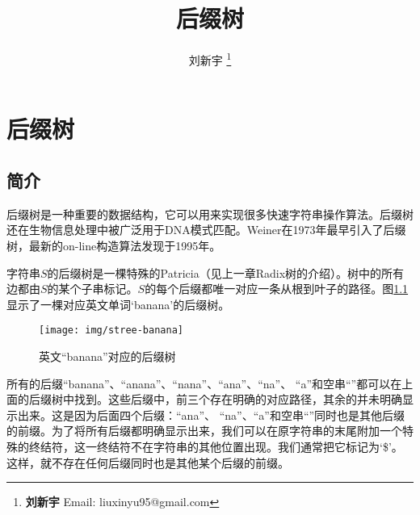 \documentclass{ctexart}
\begin{document}


\title{后缀树}

\author{刘新宇
\thanks{{\bfseries 刘新宇 } \newline
  Email: liuxinyu95@gmail.com \newline}
  }

\maketitle
\fi


\ifx\wholebook\relax
\chapter{后缀树}
\fi


\section{简介}
\label{introduction}

后缀树是一种重要的数据结构，它可以用来实现很多快速字符串操作算法\cite{wiki-suffix-tree}。后缀树还在生物信息处理中被广泛用于DNA模式匹配\cite{ukkonen-presentation}。Weiner在1973年最早引入了后缀树\cite{weiner73}，最新的on-line构造算法发现于1995年\cite{ukkonen95}。

字符串$S$的后缀树是一棵特殊的Patricia（见上一章Radix树的介绍）。树中的所有边都由$S$的某个子串标记。$S$的每个后缀都唯一对应一条从根到叶子的路径。图\ref{fig:stree-banana}显示了一棵对应英文单词‘banana’的后缀树。

\begin{figure}[htbp]
  \centering
  \texttt{[image: img/stree-banana]}
  \caption{英文“banana”对应的后缀树} \label{fig:stree-banana}
\end{figure}

所有的后缀“banana”、“anana”、“nana”、“ana”、“na”、
“a”和空串“”都可以在上面的后缀树中找到。这些后缀中，前三个存在明确的对应路径，其余的并未明确显示出来。这是因为后面四个后缀：“ana”、
“na”、“a”和空串“”同时也是其他后缀的前缀。为了将所有后缀都明确显示出来，我们可以在原字符串的末尾附加一个特殊的终结符，这一终结符不在字符串的其他位置出现。我们通常把它标记为‘\$’。这样，就不存在任何后缀同时也是其他某个后缀的前缀。
\end{document}
